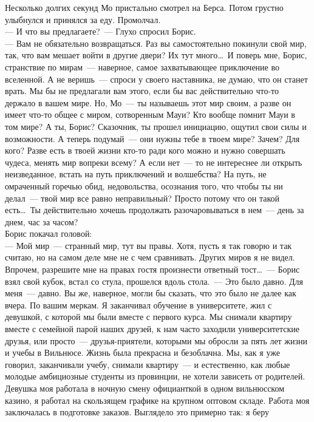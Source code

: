Несколько долгих секунд Мо пристально смотрел на Берса. Потом грустно улыбнулся 
и принялся за еду. Промолчал.\\
--- И что вы предлагаете?~--- Глухо спросил Борис.\\
--- Вам не обязательно возвращаться. Раз вы самостоятельно покинули свой мир, 
так, что вам мешает войти в другие двери? Их тут много\ldots\ И поверь мне, Борис, 
странствие по мирам~--- наверное, самое захватывающее приключение во вселенной. 
А не веришь~--- спроси у своего наставника, не думаю, что он станет врать. Мы бы 
не предлагали вам этого, если бы вас действительно что-то держало в вашем мире. 
Но, Мо~--- ты называешь этот мир своим, а разве он имеет что-то общее с миром, 
сотворенным Мауи? Кто вообще помнит Мауи в том мире? А ты, Борис? Сказочник, ты 
прошел инициацию, ощутил свои силы и возможности. А теперь подумай~--- они 
нужны тебе в твоем мире? Зачем? Для кого? Разве есть в твоей жизни кто-то ради кого 
можно и нужно совершать чудеса, менять мир вопреки всему? А если нет~--- то не 
интереснее ли открыть неизведанное, встать на путь приключений и волшебства? На 
путь, не омраченный горечью обид, недовольства, осознания того, что чтобы ты ни 
делал~--- твой мир все равно неправильный? Просто потому что он такой 
есть\ldots\ Ты действительно хочешь продолжать разочаровываться в нем~--- день за днем, час за 
часом?\\
Борис покачал головой:\\
--- Мой мир~--- странный мир, тут вы правы. Хотя, пусть я так говорю и так 
считаю, но на самом деле мне не с чем сравнивать. Других миров я не видел. Впрочем, 
разрешите мне на правах гостя произнести ответный тост\ldots~--- Борис взял 
свой кубок, встал со стула, прошелся вдоль стола.~--- Это было давно. Для меня~--- давно. 
Вы же, наверное, могли бы сказать, что это было не далее как вчера. По вашим меркам. Я 
заканчивал обучение в университете, жил с девушкой, с которой мы были вместе с 
первого курса. Мы снимали квартиру вместе с семейной парой наших друзей, к нам 
часто заходили университетские друзья, или просто~--- друзья-приятели, которыми 
мы обросли за пять лет жизни и учебы в Вильнюсе. Жизнь была прекрасна и 
безоблачна. Мы, как я уже говорил, заканчивали учебу, снимали квартиру~--- и естественно, 
как любые молодые амбициозные студенты из провинции, не хотели зависеть от 
родителей. Девушка моя работала в ночную смену официанткой в одном вильнюсском 
казино, я работал на скользящем графике на крупном оптовом складе.
Работа моя заключалась в подготовке заказов. Выглядело это примерно так: я беру 
